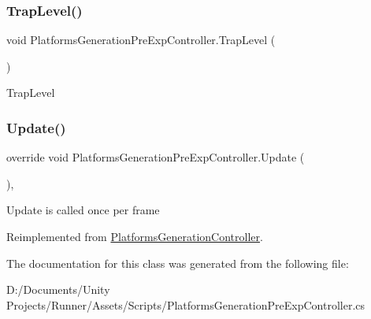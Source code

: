 \subsubsection{\texorpdfstring{Trap\+Level()}{TrapLevel()}}
{\footnotesize\ttfamily void Platforms\+Generation\+Pre\+Exp\+Controller.\+Trap\+Level (\begin{DoxyParamCaption}{ }\end{DoxyParamCaption})\hspace{0.3cm}{\ttfamily [private]}}

Trap\+Level \mbox{\label{class_platforms_generation_pre_exp_controller_a21734bbe5479a03708e00e308ca384cb}} 
\subsubsection{\texorpdfstring{Update()}{Update()}}
{\footnotesize\ttfamily override void Platforms\+Generation\+Pre\+Exp\+Controller.\+Update (\begin{DoxyParamCaption}{ }\end{DoxyParamCaption})\hspace{0.3cm}{\ttfamily [protected]}, {\ttfamily [virtual]}}

Update is called once per frame 

Reimplemented from \mbox{\hyperlink{class_platforms_generation_controller_ad014a93027f02d91fb93698b8f872606}{Platforms\+Generation\+Controller}}.



The documentation for this class was generated from the following file\+:\begin{DoxyCompactItemize}
\item 
D\+:/\+Documents/\+Unity Projects/\+Runner/\+Assets/\+Scripts/Platforms\+Generation\+Pre\+Exp\+Controller.\+cs\end{DoxyCompactItemize}
